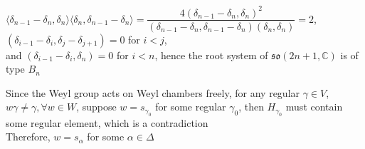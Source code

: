 \documentclass[main]{subfiles}
\begin{document}
$\langle\delta_{n-1}-\delta_n,\delta_n\rangle\langle\delta_n,\delta_{n-1}-\delta_n\rangle=\dfrac{4(\delta_{n-1}-\delta_n,\delta_n)^2}{(\delta_{n-1}-\delta_n,\delta_{n-1}-\delta_n)(\delta_n,\delta_n)}=2$, $(\delta_{i-1}-\delta_i,\delta_j-\delta_{j+1})=0$ for $i<j$, \\
and $(\delta_{i-1}-\delta_i,\delta_n)=0$ for $i<n$, hence the root system of $\mathfrak{so}(2n+1,\mathbb C)$ is of type $B_n$ \\
\begin{center}
\end{center}

\begin{exercise}
\begin{enumerate}[label=(\alph*),leftmargin=*]

\end{enumerate}
\end{exercise}

Since the Weyl group acts on Weyl chambers freely, for any regular $\gamma\in V$, $w\gamma\neq\gamma,\forall w\in W$, suppose $w=s_{\gamma_0}$ for some regular $\gamma_0$, then $H_{\gamma_0}$ must contain some regular element, which is a contradiction \\
Therefore, $w=s_\alpha$ for some $\alpha\in \Delta$ \\

\begin{exercise}
\begin{enumerate}[label=(\alph*),leftmargin=*]

\end{enumerate}
\end{exercise}
\end{document}
